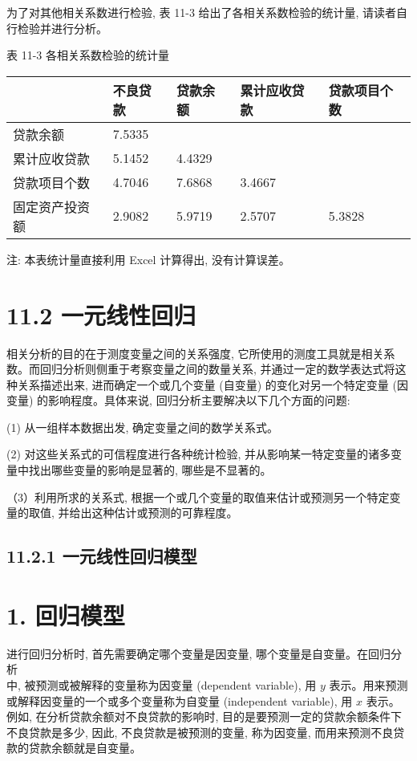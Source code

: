 \documentclass[10pt]{article}
\begin{document}
\begin{CJK*}{UTF8}{bsmi}
为了对其他相关系数进行检验, 表 11-3 给出了各相关系数检验的统计量, 请读者自行检验并进行分析。

表 11-3 各相关系数检验的统计量

\begin{center}
\begin{tabular}{lllll}
\hline
 & 不良贷款 & 贷款余额 & 累计应收贷款 & 贷款项目个数 \\
\hline
贷款余额 & 7.5335 &  &  &  \\
累计应收贷款 & 5.1452 & 4.4329 &  &  \\
贷款项目个数 & 4.7046 & 7.6868 & 3.4667 &  \\
固定资产投资额 & 2.9082 & 5.9719 & 2.5707 & 5.3828 \\
\hline
\end{tabular}
\end{center}

注: 本表统计量直接利用 Excel 计算得出, 没有计算误差。

\section*{11.2 一元线性回归}
相关分析的目的在于测度变量之间的关系强度, 它所使用的测度工具就是相关系数。而回归分析则侧重于考察变量之间的数量关系, 并通过一定的数学表达式将这种关系描述出来, 进而确定一个或几个变量 (自变量) 的变化对另一个特定变量 (因变量) 的影响程度。具体来说, 回归分析主要解决以下几个方面的问题:

(1) 从一组样本数据出发, 确定变量之间的数学关系式。

(2) 对这些关系式的可信程度进行各种统计检验, 并从影响某一特定变量的诸多变量中找出哪些变量的影响是显著的, 哪些是不显著的。

（3）利用所求的关系式, 根据一个或几个变量的取值来估计或预测另一个特定变量的取值, 并给出这种估计或预测的可靠程度。

\subsection*{11.2.1 一元线性回归模型}
\section*{1. 回归模型}
进行回归分析时, 首先需要确定哪个变量是因变量, 哪个变量是自变量。在回归分析\\
中, 被预测或被解释的变量称为因变量 (dependent variable), 用 $y$ 表示。用来预测或解释因变量的一个或多个变量称为自变量 (independent variable), 用 $x$ 表示。例如, 在分析贷款余额对不良贷款的影响时, 目的是要预测一定的贷款余额条件下不良贷款是多少, 因此, 不良贷款是被预测的变量, 称为因变量, 而用来预测不良贷款的贷款余额就是自变量。


\end{CJK*}
\end{document}

